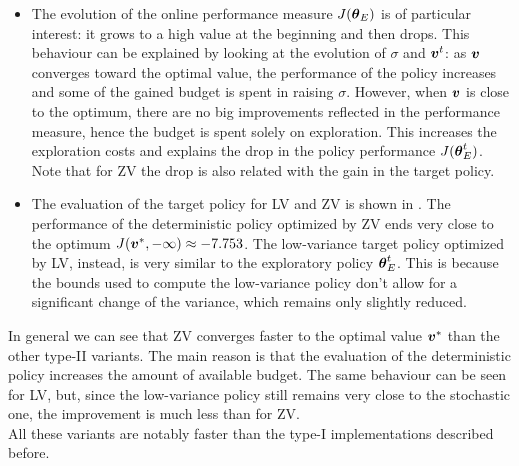 \begin{itemize}
\item The evolution of the online performance measure $J({\boldsymbol{\theta}}_E)$ is of particular interest: it grows to a high value at the beginning and then drops. This behaviour can be explained by looking at the evolution of $\sigma$ and $\boldsymbol{v}^t$: as $\boldsymbol{v}$ converges toward the optimal value, the performance of the policy increases and some of the gained budget is spent in raising $\sigma$. However, when $\boldsymbol{v}$ is close to the optimum, there are no big improvements reflected in the performance measure, hence the budget is spent solely on exploration. This increases the exploration costs and explains the drop in the policy performance $J({\boldsymbol{\theta}}^t_E)$. Note that for ZV the drop is also related with the gain in the target policy.

\item The evaluation of the target policy for LV and ZV is shown in . The performance of the deterministic policy optimized by ZV ends very close to the optimum $J(\boldsymbol{v}^*,-\infty)\approx-7.753$. The low-variance target policy optimized by LV, instead, is very similar to the exploratory policy ${\boldsymbol{\theta}}^t_E$. This is because the bounds used to compute the low-variance policy don't allow for a significant change of the variance, which remains only slightly reduced. 
\end{itemize}

In general we can see that ZV converges faster to the optimal value $\boldsymbol{v}^*$ than the other type-II variants. The main reason is that the evaluation of the deterministic policy increases the amount of available budget. The same behaviour can be seen for LV, but, since the low-variance policy still remains very close to the stochastic one, the improvement is much less than for ZV. \\
All these variants are notably faster than the type-I implementations described before.

